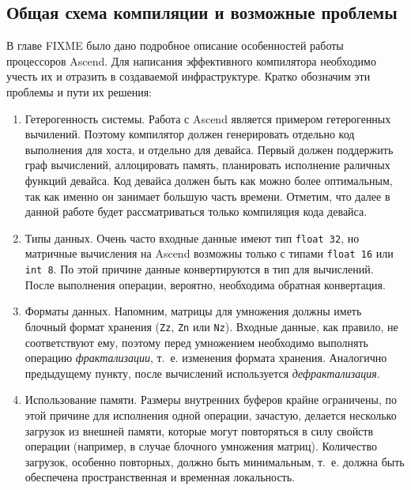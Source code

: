 \subsection{Общая схема компиляции и возможные проблемы}
\label{impl:problem}

В главе FIXME было дано подробное описание особенностей работы процессоров Ascend.
Для написания эффективного компилятора необходимо учесть их и отразить
в создаваемой инфраструктуре. Кратко обозначим эти проблемы и пути их решения:

\begin{enumerate}
    \item Гетерогенность системы. Работа с Ascend является примером гетерогенных
          вычилений. Поэтому компилятор должен генерировать отдельно код выполнения
          для хоста, и отдельно для девайса. Первый должен поддержить граф
          вычислений, аллоцировать память, планировать исполнение раличных
          функций девайса. Код девайса должен быть как можно более оптимальным,
          так как именно он занимает большую часть времени. Отметим, что далее
          в данной работе будет рассматриваться только компиляция кода девайса.
    
    \item Типы данных. Очень часто входные данные имеют тип \texttt{float 32},
          но матричные вычисления на Ascend возможны только с типами
          \texttt{float 16} или \texttt{int 8}. По этой причине данные
          конвертируются в тип для вычислений. После выполнения операции,
          вероятно, необходима обратная конвертация.

    \item Форматы данных. Напомним, матрицы для умножения должны иметь блочный
          формат хранения (\texttt{Zz}, \texttt{Zn} или \texttt{Nz}). Входные
          данные, как правило, не соответствуют ему, поэтому перед умножением
          необходимо выполнять операцию \textit{фрактализации}, т.~е. изменения
          формата хранения. Аналогично предыдущему пункту, после вычислений
          используется \textit{дефрактализация}.

    \item Использование памяти. Размеры внутренних буферов крайне ограничены,
          по этой причине для исполнения одной операции, зачастую, делается
          несколько загрузок из внешней памяти, которые могут повторяться в
          силу свойств операции (например, в случае блочного умножения матриц).
          Количество загрузок, особенно повторных, должно быть минимальным,
          т.~е. должна быть обеспечена пространственная и временная локальность.


\end{enumerate}
